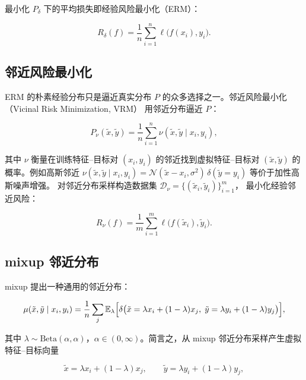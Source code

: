 \documentclass[11pt,a4paper]{article}
\theoremstyle{definition}
\begin{document}
最小化 $P_\delta$ 下的平均损失即经验风险最小化（ERM）：

\begin{equation}
  R_\delta(f)=\frac{1}{n}\sum_{i=1}^{n}\ell\bigl(f(x_i),y_i\bigr).
  \label{eq:erm}
\end{equation}

\subsection{邻近风险最小化}

ERM 的朴素经验分布只是逼近真实分布 $P$ 的众多选择之一。邻近风险最小化
（Vicinal Risk Minimization, VRM）\cite{chapelle2000vicinal} 用邻近分布逼近 $P$：

\begin{equation}
  P_\nu(\tilde{x},\tilde{y})=\frac{1}{n}\sum_{i=1}^{n}\nu(\tilde{x},\tilde{y}\mid x_i,y_i),
  \label{eq:vicinal-dist}
\end{equation}

其中 $\nu$ 衡量在训练特征--目标对 $(x_i,y_i)$ 的邻近找到虚拟特征--目标对
$(\tilde{x},\tilde{y})$ 的概率。例如高斯邻近 $\nu(\tilde{x},\tilde{y}\mid x_i,y_i)
=\mathcal{N}(\tilde{x}-x_i,\sigma^2)\,\delta(\tilde{y}=y_i)$ 等价于加性高斯噪声增强。
对邻近分布采样构造数据集 $\mathcal{D}_\nu=\{(\tilde{x}_i,\tilde{y}_i)\}_{i=1}^{m}$，
最小化经验邻近风险：

\begin{equation}
  R_\nu(f)=\frac{1}{m}\sum_{i=1}^{m}\ell\bigl(f(\tilde{x}_i),\tilde{y}_i\bigr).
  \label{eq:vicinal-risk}
\end{equation}

\subsection{mixup 邻近分布}

mixup 提出一种通用的邻近分布\cite{zhang2018mixup}：

\begin{equation}
  \mu(\tilde{x},\tilde{y}\mid x_i,y_i)
  =\frac{1}{n}\sum_{j}\mathbb{E}_{\lambda}\Bigl[
    \delta\bigl(\tilde{x}=\lambda x_i+(1-\lambda)x_j,\;
    \tilde{y}=\lambda y_i+(1-\lambda)y_j\bigr)
  \Bigr],
  \label{eq:mixup-dist}
\end{equation}

其中 $\lambda\sim\mathrm{Beta}(\alpha,\alpha)$，$\alpha\in(0,\infty)$。简言之，从 mixup
邻近分布采样产生虚拟特征--目标向量

\begin{equation}
  \tilde{x}=\lambda x_i+(1-\lambda)x_j,\qquad
  \tilde{y}=\lambda y_i+(1-\lambda)y_j,
  \label{eq:mixup-sample}
\end{equation}
\end{document}
